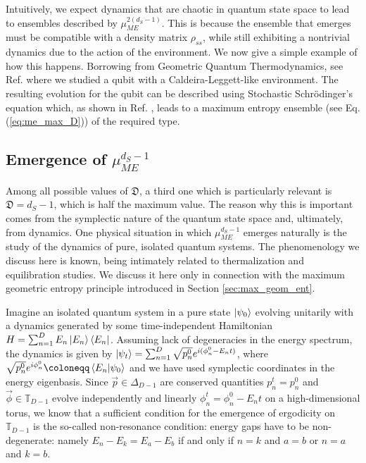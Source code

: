 \documentclass[draft,nofootinbib,pre,twocolumn,showpacs,showkeys,groupaddress,preprintnumbers,floatfix]{revtex4-1}
\newcommand{\1}{\mathbbm{1}}
\newcommand{\ID}{\mathfrak{D}}
\begin{document}
Intuitively, we expect dynamics that are chaotic in quantum state space to lead
to ensembles described by $\mu_{ME}^{2(d_S-1)}$. This is because the ensemble
that emerges must be compatible with a density matrix $\rho_{ss}$, while still
exhibiting a nontrivial dynamics due to the action of the environment. We now
give a simple example of how this happens. Borrowing from Geometric Quantum
Thermodynamics, see Ref. \cite{Anza22} where we studied a qubit with a
Caldeira-Leggett-like environment. The resulting evolution for the qubit can be
described using Stochastic Schr\"odinger's equation which, as shown in Ref.
\cite{Anza22}, leads to a maximum entropy ensemble (see Eq.
(\ref{eq:me_max_D})) of the required type.

\subsection*{Emergence of $\mu_{ME}^{d_S-1}$}

Among all possible values of $\ID$, a third one which is particularly relevant
is $\ID = d_S-1$, which is half the maximum value. The reason why this is
important comes from the symplectic nature of the quantum state space and,
ultimately, from dynamics. One physical situation in which $\mu_{ME}^{d_S-1}$
emerges naturally is the study of the dynamics of pure, isolated quantum
systems. The phenomenology we discuss here is known, being intimately related
to thermalization and equilibration studies. We discuss it here only in
connection with the maximum geometric entropy principle introduced in
Section \ref{sec:max_geom_ent}.

Imagine an isolated quantum system in a pure state $\ket{\psi_0}$ evolving
unitarily with a dynamics generated by some time-independent Hamiltonian $H =
\sum_{n=1}^{D}E_n \ket{E_n}\bra{E_n}$. Assuming lack of degeneracies in the
energy spectrum, the dynamics is given by $\ket{\psi_t} =
\sum_{n=1}^{D}\sqrt{p_n^0}e^{i(\phi^0_n - E_n t)}$, where
$\sqrt{p^0_n}e^{i\phi^0_n}\coloneqq \braket{E_n}{\psi_0}$ and we have used
symplectic coordinates in the energy eigenbasis. Since $\vec{p} \in
\Delta_{D-1}$ are conserved quantities $p_n^t = p_n^0$ and $\vec{\phi} \in
\mathbb{T}_{D-1}$ evolve independently and linearly $\phi_n^t = \phi_n^0 - E_n
t$ on a high-dimensional torus, we know that a sufficient condition for the
emergence of ergodicity on $\mathbb{T}_{D-1}$ is the so-called non-resonance
condition: energy gaps have to be non-degenerate: namely $E_n - E_k = E_a -
E_b$ if and only if $n=k$ and $a=b$ or $n=a$ and $k=b$.
\end{document}
